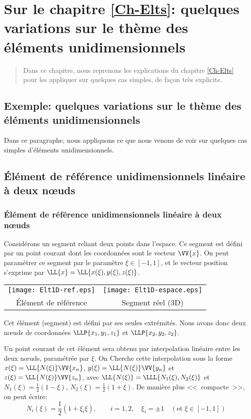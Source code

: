 \ifVersionAvecExemplesSepares
   \chapter{Sur le chapitre \ref{Ch-Elts}: quelques variations sur le thème des éléments unidimensionnels}
   \begin{abstract}
   Dans ce chapitre, nous reprenons les explications du chapitre \ref{Ch-Elts} pour les appliquer
   sur quelques cas simples, de façon très explicite.
   \end{abstract}
\else
   \section{Exemple: quelques variations sur le thème des éléments unidimensionnels}

   Dans ce paragraphe, nous appliquons ce que nous venons de voir sur quelques cas simples d'éléments unidimensionnels.
\fi

\medskipvm
\ifVersionAvecExemplesSepares
   \section{Élément de référence unidimensionnels linéaire à deux nœuds}\label{Sec-Elt1D2}
\else
   \subsection{Élément de référence unidimensionnels linéaire à deux nœuds}\label{Sec-Elt1D2}
\fi

Considérons un segment reliant deux points dans l'espace.
Ce segment est défini par un point courant dont les coordonnées sont le vecteur $\VV{x}$.
On peut paramétrer ce segment par le paramètre $\xi \in [-1,1]$, et le vecteur
position s'exprime par $\LL{x}=\LL{x(\xi), y(\xi), z(\xi)}$.
\begin{table}[ht]\centering\small
\begin{tabular}{cc}
\texttt{[image: Elt1D-ref.eps]} &
\texttt{[image: Elt1D-espace.eps]} \\
Élément de référence & Segment réel (3D)
\end{tabular}
\end{table}
\ifVersionDuDocEstVincent

\medskipvm\fi
Cet élément (segment) est défini par ses seules extrémités. Nous avons donc deux
nœuds de coordonnées $\LLP{x_1, y_1, z_1}$ et $\LLP{x_2, y_2, z_2}$.\ifVersionDuDocEstVincent\par\fi
Un point courant de cet élément sera obtenu par interpolation linéaire entre les deux nœuds,
paramétrée par $\xi$. On Cherche cette interpolation sous la forme $x(\xi)=\LL{N(\xi)}\VV{x_n}$, $y(\xi)=\LL{N(\xi)}\VV{y_n}$ et $z(\xi)=\LL{N(\xi)}\VV{z_n}$, avec
$\LL{N(\xi)}=\LLL{N_1(\xi), N_2(\xi)}$ et $N_1(\xi)=\frac12 (1-\xi)$, $N_2(\xi)=\frac12(1+\xi)$.
De manière plus <<~compacte~>>, on peut écrire:
\begin{equation} N_i(\xi)=\frac12(1+\xi_i\xi), \qquad i=1,2, \quad \xi_i=\pm1 \quad (\text{et } \xi\in[-1,1]) \end{equation}
\ifVersionDuDocEstVincent

